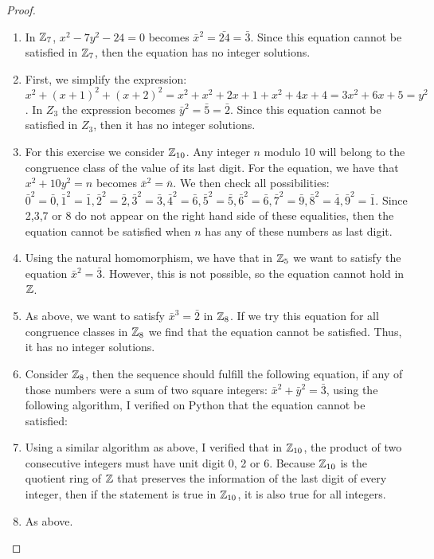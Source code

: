 \begin{proof}
 \begin{enumerate}
     \item In $\mathbb{Z}_{7}$, $x^{2}-7y^{2}-24=0$ becomes $\bar{x}^{2}=\bar{24}=\bar{3}$. Since this equation cannot be satisfied in $\mathbb{Z}_{7}$, then the equation has no integer solutions.
     \item First, we simplify the expression: $x^{2}+(x+1)^{2}+(x+2)^{2}=x^{2}+x^{2}+2x+1+x^{2}+4x+4=3x^{2}+6x+5=y^{2}$. In $Z_{3}$ the expression becomes $\bar{y}^{2}=\bar{5}=\bar{2}$. Since this equation cannot be satisfied in $Z_{3}$, then it has no integer solutions.
     \item For this exercise we consider $\mathbb{Z}_{10}$. Any integer $n$ modulo 10 will belong to the congruence class of the value of its last digit. For the equation, we have that $x^{2}+10y^{2}=n$ becomes $\bar{x}^{2}=\bar{n}$. We then check all possibilities: $\bar{0}^{2}=\bar{0}, \bar{1}^{2}=\bar{1}, \bar{2}^{2}=\bar{2}, \bar{3}^{2}=\bar{3}, \bar{4}^{2}=\bar{6}, \bar{5}^{2}=\bar{5}, \bar{6}^{2}=\bar{6}, \bar{7}^{2}=\bar{9}, \bar{8}^{2}=\bar{4}, \bar{9}^{2}=\bar{1}$. Since 2,3,7 or 8 do not appear on the right hand side of these equalities, then the equation cannot be satisfied when $n$ has any of these numbers as last digit.
     \item Using the natural homomorphism, we have that in $\mathbb{Z}_{5}$ we want to satisfy the equation $\bar{x}^{2}=\bar{3}$. However, this is not possible, so the equation cannot hold in $\mathbb{Z}$.
     \item As above, we want to satisfy $\bar{x}^{3}=\bar{2}$ in $\mathbb{Z}_{8}$. If we try this equation for all congruence classes in $\mathbb{Z}_{8}$ we find that the equation cannot be satisfied. Thus, it has no integer solutions.
     \item Consider $\mathbb{Z}_{8}$, then the sequence should fulfill the following equation, if any of those numbers were a sum of two square integers: $\bar{x}^{2}+\bar{y}^{2}=\bar{3}$, using the following algorithm, I verified on Python that the equation cannot be satisfied:
     \begin{algorithmic}
        \ENDFOR
    \end{algorithmic}
    \item Using a similar algorithm as above, I verified that in $\mathbb{Z}_{10}$, the product of two consecutive integers must have unit digit 0, 2 or 6. Because $\mathbb{Z}_{10}$ is the quotient ring of $\mathbb{Z}$ that preserves the information of the last digit of every integer, then if the statement is true in $\mathbb{Z}_{10}$, it is also true for all integers.
    \item As above.
 \end{enumerate}
\end{proof}
